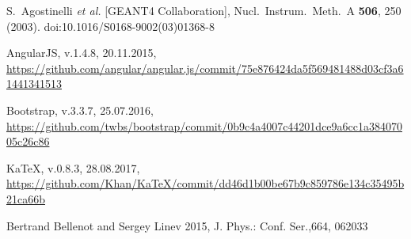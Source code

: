 \begin{thebibliography}{}
%
%
S.~Agostinelli {\it et al.} [GEANT4 Collaboration],
  Nucl.\ Instrum.\ Meth.\ A {\bf 506}, 250 (2003).
  doi:10.1016/S0168-9002(03)01368-8

AngularJS, v.1.4.8, 20.11.2015, \url{https://github.com/angular/angular.js/commit/75e876424da5f569481488d03cf3a61441341513}

Bootstrap, v.3.3.7, 25.07.2016, \url{https://github.com/twbs/bootstrap/commit/0b9c4a4007c44201dce9a6cc1a38407005c26c86}

KaTeX, v.0.8.3, 28.08.2017,
\url{https://github.com/Khan/KaTeX/commit/dd46d1b00be67b9c859786e134c35495b21ca66b}

Bertrand Bellenot and Sergey Linev 2015, J. Phys.: Conf. Ser.,664,  062033

\end{thebibliography}